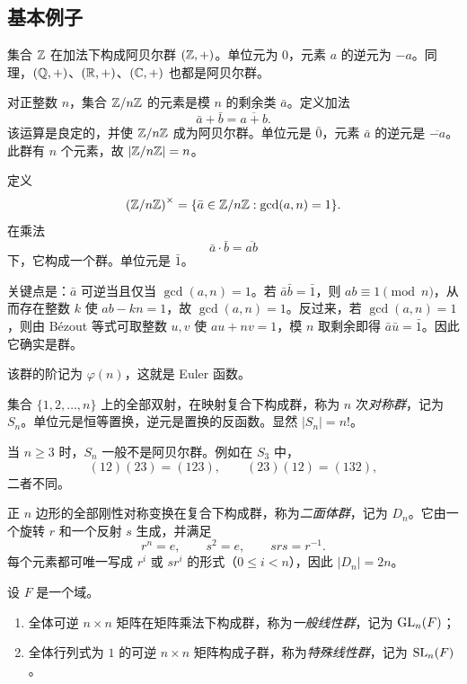 \subsection*{基本例子}

\begin{example}[整数加法群]
集合 $\mathbb{Z}$ 在加法下构成阿贝尔群 $(\mathbb{Z},+)$。单位元为 $0$，元素 $a$ 的逆元为 $-a$。同理，$(\mathbb{Q},+)$、$(\mathbb{R},+)$、$(\mathbb{C},+)$ 也都是阿贝尔群。
\end{example}

\begin{example}[模 $n$ 剩余类加法群]
对正整数 $n$，集合 $\mathbb{Z}/n\mathbb{Z}$ 的元素是模 $n$ 的剩余类 $\bar a$。定义加法
\[
\bar a+\bar b=\overline{a+b}.
\]
该运算是良定的，并使 $\mathbb{Z}/n\mathbb{Z}$ 成为阿贝尔群。单位元是 $\bar 0$，元素 $\bar a$ 的逆元是 $\overline{-a}$。此群有 $n$ 个元素，故 $|\mathbb{Z}/n\mathbb{Z}|=n$。
\end{example}

\begin{example}[模 $n$ 可逆剩余类群]
定义
\[
\left(\mathbb{Z}/n\mathbb{Z}\right)^\times=\{\bar a \in \mathbb{Z}/n\mathbb{Z}: \gcd(a,n)=1\}.
\]
在乘法
\[
\bar a\cdot\bar b=\overline{ab}
\]
下，它构成一个群。单位元是 $\bar 1$。

关键点是：$\bar a$ 可逆当且仅当 $\gcd(a,n)=1$。若 $\bar a\bar b=\bar 1$，则 $ab\equiv 1 \pmod n$，从而存在整数 $k$ 使 $ab-kn=1$，故 $\gcd(a,n)=1$。反过来，若 $\gcd(a,n)=1$，则由 Bézout 等式可取整数 $u,v$ 使 $au+nv=1$，模 $n$ 取剩余即得 $\bar a\bar u=\bar 1$。因此它确实是群。

该群的阶记为 $\varphi(n)$，这就是 Euler 函数。
\end{example}

\begin{example}[对称群 $S_n$]
集合 $\{1,2,\dots,n\}$ 上的全部双射，在映射复合下构成群，称为 $n$ 次\emph{对称群}，记为 $S_n$。单位元是恒等置换，逆元是置换的反函数。显然 $|S_n|=n!$。

当 $n\ge 3$ 时，$S_n$ 一般不是阿贝尔群。例如在 $S_3$ 中，
\[
(12)(23)=(123), \qquad (23)(12)=(132),
\]
二者不同。
\end{example}

\begin{example}[二面体群 $D_n$]
正 $n$ 边形的全部刚性对称变换在复合下构成群，称为\emph{二面体群}，记为 $D_n$。它由一个旋转 $r$ 和一个反射 $s$ 生成，并满足
\[
 r^n=e, \qquad s^2=e, \qquad srs=r^{-1}.
\]
每个元素都可唯一写成 $r^i$ 或 $sr^i$ 的形式（$0\le i<n$），因此 $|D_n|=2n$。
\end{example}

\begin{example}[矩阵群]
设 $F$ 是一个域。
\begin{enumerate}[label=\textnormal{(\arabic*)}, leftmargin=3em]
  \item 全体可逆 $n\times n$ 矩阵在矩阵乘法下构成群，称为\emph{一般线性群}，记为 $\mathrm{GL}_n(F)$；
  \item 全体行列式为 $1$ 的可逆 $n\times n$ 矩阵构成子群，称为\emph{特殊线性群}，记为 $\mathrm{SL}_n(F)$。
\end{enumerate}
\end{example}


